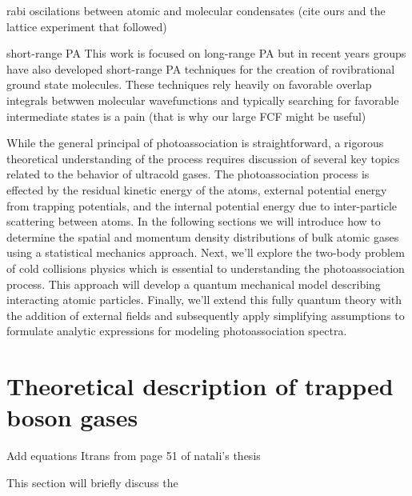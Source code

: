 rabi oscilations between atomic and molecular condensates (cite ours and the lattice experiment that followed)

short-range PA
This work is focused on long-range PA but in recent years groups have also developed short-range PA techniques for the creation of rovibrational ground state molecules. These techniques rely heavily on favorable overlap integrals betwwen molecular wavefunctions and typically searching for favorable intermediate states is a pain (that is why our large FCF might be useful)

While the general principal of photoassociation is straightforward, a rigorous theoretical understanding of the process requires discussion of several key topics related to the behavior of ultracold gases. 
The photoassociation process is effected by the residual kinetic energy of the atoms, external potential energy from trapping potentials, and the internal potential energy due to inter-particle scattering between atoms.
In the following sections we will introduce how to determine the spatial and momentum density distributions of bulk atomic gases using a statistical mechanics approach. Next, we'll explore the two-body problem of cold collisions physics which is essential to understanding the photoassociation process. This approach will develop a quantum mechanical model describing interacting atomic particles. Finally, we'll extend this fully quantum theory with the addition of external fields and subsequently apply simplifying assumptions to formulate analytic expressions for modeling photoassociation spectra.



\section{Theoretical description of trapped boson gases} \label{sec:trapped_gases}

Add equations Itrans from page 51 of natali's thesis

This section will briefly discuss the 

